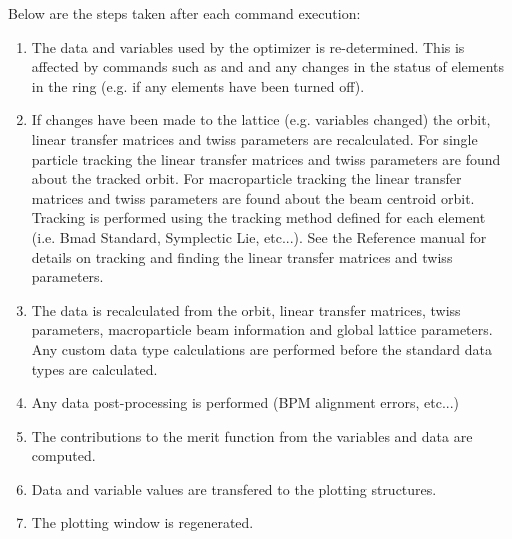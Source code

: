 Below are the steps taken after each \tao command execution:
\begin{enumerate}
  \item The data and variables used by the optimizer is re-determined. This is
affected by commands such as  and  and any changes in the
status of elements in the ring (e.g. if any elements have been turned off). 
  \item If changes have been made to the lattice (e.g. variables changed) the
 orbit, linear transfer matrices and twiss parameters are recalculated. 
For single particle tracking the linear transfer matrices and twiss parameters are 
found about the tracked
orbit. For macroparticle tracking the linear transfer matrices and twiss parameters are 
found about the beam centroid orbit. 
Tracking is performed using the tracking method defined for
each element (i.e. Bmad Standard, Symplectic Lie, etc...). See the \bmad 
Reference manual for details on tracking and finding
the linear transfer matrices and twiss parameters.
  \item The  data is recalculated from the  orbit, linear
transfer matrices, twiss parameters, macroparticle beam information and global
lattice parameters.
 Any custom  data type calculations
are performed before the standard \tao data types are calculated.
  \item Any data post-processing is performed (BPM alignment errors, etc...) 
  \item The contributions to the merit function from the variables and data are
computed.
  \item Data and variable values are transfered to the plotting structures.
  \item The plotting window is regenerated.
\end{enumerate}

